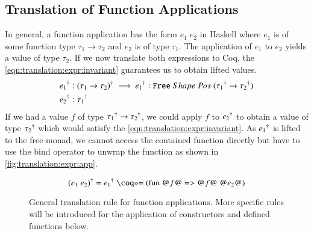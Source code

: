 \subsection{Translation of Function Applications} \label{sec:translation:expr:app}
In general, a function application has the form $e_1\;e_2$ in Haskell where $e_1$ is of some function type $\tau_1 \rightarrow \tau_2$ and $e_2$ is of type $\tau_1$.
The application of $e_1$ to $e_2$ yields a value of type $\tau_2$.
If we now translate both expressions to Coq, the \ref{eqn:translation:expr:invariant} guarantees us to obtain lifted values.
\begin{align*}
  {e_1}^{\dagger} &: {(\tau_1 \rightarrow \tau_2)}^{\dagger}
  \implies {e_1}^{\dagger} : {\texttt{Free}}\;Shape\;Pos\;{({\tau_1}^{\dagger} \rightarrow {\tau_2}^{\dagger})} \\
  {e_2}^{\dagger} &: {\tau_1}^{\dagger}
\end{align*}
If we had a value $f$ of type ${\tau_1}^{\dagger} \rightarrow {\tau_2}^{\dagger}$, we could apply $f$ to ${e_2}^{\dagger}$ to obtain a value of type ${\tau_2}^{\dagger}$ which would satisfy the \ref{eqn:translation:expr:invariant}.
As ${e_1}^{\dagger}$ is lifted to the free monad, we cannot access the contained function directly but have to use the bind operator to unwrap the function as shown in \autoref{fig:translation:expr:app}.
\begin{figure}[H]
  \[
    \toCoq{(e_1\;e_2)} = \toCoq{e_1}\;\coqM{>>= (fun @$f$@ => @$f$@ @$e_2$@)}
  \]
  \caption{General translation rule for function applications. More specific rules will be introduced for the application of constructors and defined functions below.}
  \label{fig:translation:expr:app}
\end{figure}

